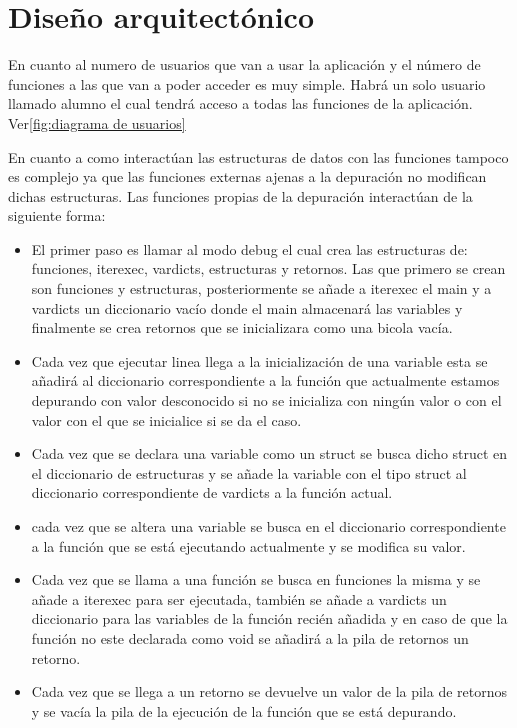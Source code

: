 \clearpage

\section{Diseño arquitectónico}

En cuanto al numero de usuarios que van a usar la aplicación  y el número de funciones a las que van a poder acceder es muy simple. Habrá un solo usuario llamado alumno el cual tendrá acceso a todas las funciones de la aplicación. Ver\ref{fig:diagrama de usuarios}

En cuanto a como interactúan las estructuras de datos con las funciones tampoco es complejo ya que las funciones externas ajenas a la depuración no modifican dichas estructuras. Las funciones propias de la depuración interactúan de la siguiente forma:
\begin{itemize}
    \item El primer paso es llamar al modo debug el cual crea las estructuras de: funciones, iterexec, vardicts, estructuras y retornos. Las que primero se crean son funciones y estructuras, posteriormente se añade a iterexec el main y a vardicts un diccionario vacío donde el main almacenará las variables y finalmente se crea retornos que se inicializara como una bicola vacía.
    \item Cada vez que ejecutar linea llega a la inicialización de una variable esta se añadirá al diccionario correspondiente a la función que actualmente estamos depurando con valor desconocido si no se inicializa con ningún valor o con el valor con el que se inicialice si se da el caso.
    \item Cada vez que se declara una variable como un struct se busca dicho struct en el diccionario de estructuras y se añade la variable con el tipo struct al diccionario correspondiente de vardicts a la función actual.
    \item cada vez que se altera una variable se busca en el diccionario correspondiente a la función que se está ejecutando actualmente y se modifica su valor.
    \item Cada vez que se llama a una función se busca en funciones la misma y se añade a iterexec para ser ejecutada, también se añade a vardicts un diccionario para las variables de la función recién añadida y en caso de que la función no este declarada como void se añadirá a la pila de retornos un retorno.
    \item Cada vez que se llega a un retorno se devuelve un valor de la pila de retornos y se vacía la pila de la ejecución de la función que se está depurando.
\end{itemize}

